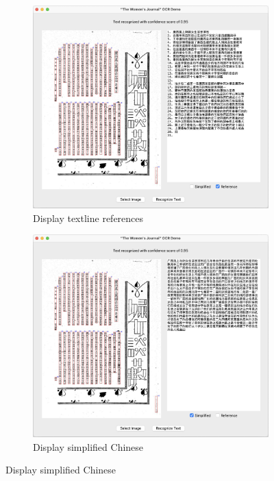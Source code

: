 \documentclass[12pt,twoside]{report}
\begin{document}
\begin{figure}[htbp]
    \begin{subfigure}[b]{0.3\linewidth}
        \includegraphics[width=\linewidth]{./figures/ui1.4.jpeg}
        \caption{Display textline references}
        \label{fig:ui1.4}
    \end{subfigure}
    \hfill
    \begin{subfigure}[b]{0.3\linewidth}
        \includegraphics[width=\linewidth]{./figures/ui1.5.jpeg}
        \caption{Display simplified Chinese}
        \label{fig:ui1.5}

\end{subfigure}
\end{figure}
\end{document}
